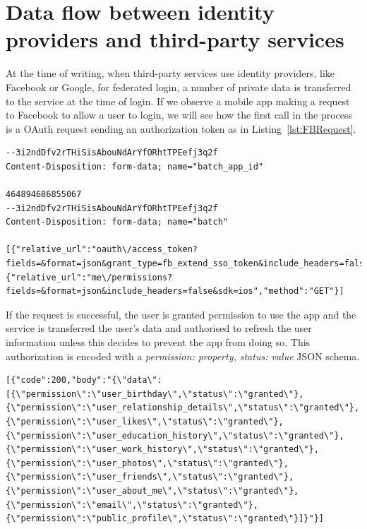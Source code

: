 \section{Data flow between identity providers and third-party services}

At the time of writing, when third-party services use identity providers, like Facebook or Google, for federated login, a number of private data is transferred to the service at the time of login. If we observe a mobile app making a request to Facebook to allow a user to login, we will see how the first call in the process is a OAuth request sending an authorization token as in Listing~\ref{lst:FBRequest}.

\begin{lstlisting}
--3i2ndDfv2rTHiSisAbouNdArYfORhtTPEefj3q2f
Content-Disposition: form-data; name="batch_app_id"

464894686855067
--3i2ndDfv2rTHiSisAbouNdArYfORhtTPEefj3q2f
Content-Disposition: form-data; name="batch"

[{"relative_url":"oauth\/access_token?fields=&format=json&grant_type=fb_extend_sso_token&include_headers=false&sdk=ios","method":"GET"},{"relative_url":"me\/permissions?fields=&format=json&include_headers=false&sdk=ios","method":"GET"}]
\end{lstlisting}

If the request is successful, the user is granted permission to use the app and the service is transferred the user's data and authorised to refresh the user information unless this decides to prevent the app from doing so. This authorization is encoded with a \emph{permission: property, status: value} JSON schema. 

\begin{lstlisting}
[{"code":200,"body":"{\"data\":[{\"permission\":\"user_birthday\",\"status\":\"granted\"},{\"permission\":\"user_relationship_details\",\"status\":\"granted\"},{\"permission\":\"user_likes\",\"status\":\"granted\"},{\"permission\":\"user_education_history\",\"status\":\"granted\"},{\"permission\":\"user_work_history\",\"status\":\"granted\"},{\"permission\":\"user_photos\",\"status\":\"granted\"},{\"permission\":\"user_friends\",\"status\":\"granted\"},{\"permission\":\"user_about_me\",\"status\":\"granted\"},{\"permission\":\"email\",\"status\":\"granted\"},{\"permission\":\"public_profile\",\"status\":\"granted\"}]}"}]
\end{lstlisting}

